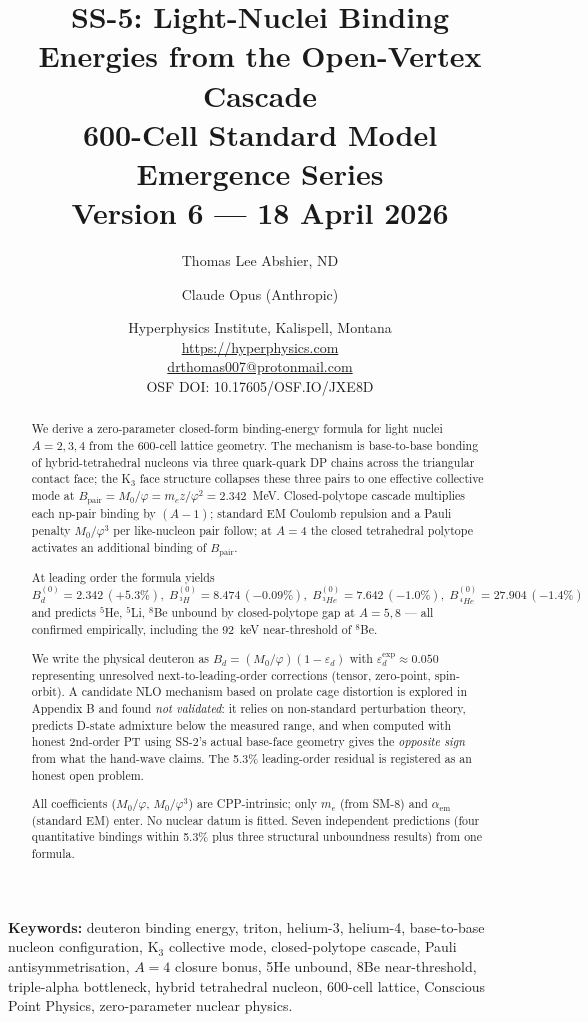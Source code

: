 \documentclass[11pt,letterpaper]{article}
\title{\textbf{SS-5: Light-Nuclei Binding Energies from the Open-Vertex Cascade}\\[6pt]
{\large 600-Cell Standard Model Emergence Series}\\[4pt]
{\normalsize Version 6 --- 18 April 2026}}
\author{Thomas Lee Abshier, ND \and Claude Opus (Anthropic)}
\date{\normalsize Hyperphysics Institute, Kalispell, Montana\\
\url{https://hyperphysics.com}\\
\href{mailto:drthomas007@protonmail.com}{drthomas007@protonmail.com}\\[4pt]
\small OSF DOI: 10.17605/OSF.IO/JXE8D}
\newcommand{\phig}{\varphi}
\newcommand{\Mzero}{M_0}
\newcommand{\Bpair}{B_{\mathrm{pair}}}
\newcommand{\Bd}{B_{d}}
\newcommand{\Bdlo}{B_{d}^{(0)}}
\newcommand{\epsd}{\varepsilon_{d}}
\begin{document}
\maketitle

\begin{abstract}
We derive a zero-parameter closed-form binding-energy formula for light nuclei $A = 2, 3, 4$ from the 600-cell lattice geometry. The mechanism is base-to-base bonding of hybrid-tetrahedral nucleons via three quark-quark DP chains across the triangular contact face; the K$_3$ face structure collapses these three pairs to one effective collective mode at $\Bpair = \Mzero/\phig = m_e z/\phig^2 = 2.342$~MeV. Closed-polytope cascade multiplies each np-pair binding by $(A-1)$; standard EM Coulomb repulsion and a Pauli penalty $\Mzero/\phig^3$ per like-nucleon pair follow; at $A = 4$ the closed tetrahedral polytope activates an additional binding of $\Bpair$.

At leading order the formula yields
\[
\Bdlo = 2.342 \,(+5.3\%),\; B^{(0)}_{\,^3\!H} = 8.474 \,(-0.09\%),\; B^{(0)}_{\,^3\!He} = 7.642 \,(-1.0\%),\; B^{(0)}_{\,^4\!He} = 27.904 \,(-1.4\%)
\]
and predicts ${}^5$He, ${}^5$Li, ${}^8$Be unbound by closed-polytope gap at $A = 5, 8$ --- all confirmed empirically, including the 92~keV near-threshold of ${}^8$Be.

We write the physical deuteron as $\Bd = (\Mzero/\phig)(1-\epsd)$ with $\epsd^{\mathrm{exp}} \approx 0.050$ representing unresolved next-to-leading-order corrections (tensor, zero-point, spin-orbit). A candidate NLO mechanism based on prolate cage distortion is explored in Appendix B and found \emph{not validated}: it relies on non-standard perturbation theory, predicts D-state admixture below the measured range, and when computed with honest 2nd-order PT using SS-2's actual base-face geometry gives the \emph{opposite sign} from what the hand-wave claims. The 5.3\% leading-order residual is registered as an honest open problem.

All coefficients ($\Mzero/\phig$, $\Mzero/\phig^3$) are CPP-intrinsic; only $m_e$ (from SM-8) and $\alpha_{\mathrm{em}}$ (standard EM) enter. No nuclear datum is fitted. Seven independent predictions (four quantitative bindings within 5.3\% plus three structural unboundness results) from one formula.
\end{abstract}

\medskip\noindent
\textbf{Keywords:} deuteron binding energy, triton, helium-3, helium-4, base-to-base nucleon configuration, K$_3$ collective mode, closed-polytope cascade, Pauli antisymmetrisation, $A=4$ closure bonus, 5He unbound, 8Be near-threshold, triple-alpha bottleneck, hybrid tetrahedral nucleon, 600-cell lattice, Conscious Point Physics, zero-parameter nuclear physics.
\end{document}
